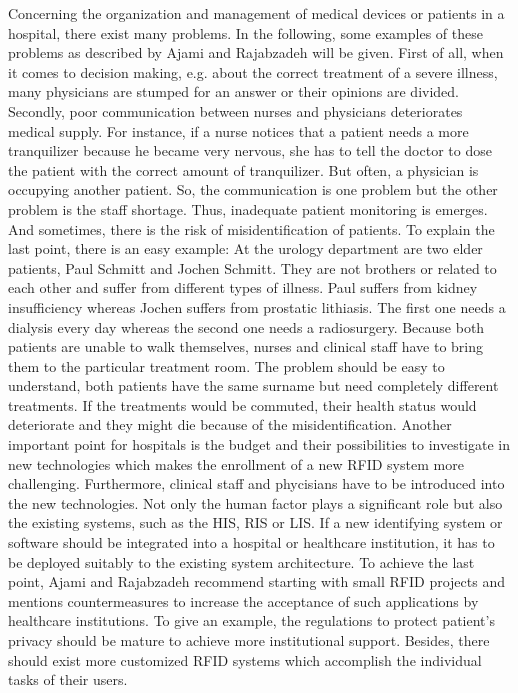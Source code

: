 Concerning the organization and management of medical devices or patients in a hospital, there exist many problems. In the following, some examples of these problems as described by Ajami and Rajabzadeh  \cite{ncbi} will be given.
First of all, when it comes to decision making, e.g. about the correct treatment of a severe illness, many physicians are stumped for an answer or their opinions are divided. 
Secondly, poor communication between nurses and physicians deteriorates medical supply. For instance, if a nurse notices that a patient needs a more tranquilizer because he became very nervous, she has to tell the doctor to dose the patient with the correct amount of tranquilizer. But often, a physician is occupying another patient. So, the communication is one problem but the other problem is the staff shortage. Thus, inadequate patient monitoring is emerges. And sometimes, there is the risk of misidentification of patients. To explain the last point, there is an easy example: At the urology department are two elder patients, Paul Schmitt and Jochen Schmitt. They are not brothers or related to each other and suffer from different types of illness. Paul suffers from kidney insufficiency whereas Jochen suffers from prostatic lithiasis. The first one needs a dialysis every day whereas the second one needs a radiosurgery. Because both patients are unable to walk themselves, nurses and clinical staff have to bring them to the particular treatment room. The problem should be easy to understand, both patients have the same surname but need completely different treatments. If the treatments would be commuted, their health status would deteriorate and they might die because of the misidentification.
Another important point for hospitals is the budget and their possibilities to investigate in new technologies which makes the enrollment of a new RFID system more challenging. Furthermore, clinical staff and phycisians have to be introduced into the new technologies. Not only the human factor plays a significant role but also the existing systems, such as the \ac{HIS}, \ac{RIS} or \ac{LIS}. If a new identifying system or software should be integrated into a hospital or healthcare institution, it has to be deployed suitably to the existing system architecture. To achieve the last point, Ajami and Rajabzadeh \cite{ncbi} recommend starting with small RFID projects and mentions countermeasures to increase the acceptance of such applications by healthcare institutions. To give an example, the regulations to protect patient's privacy should be mature to achieve more institutional support. Besides, there should exist more customized RFID systems which accomplish the individual tasks of their users.  
